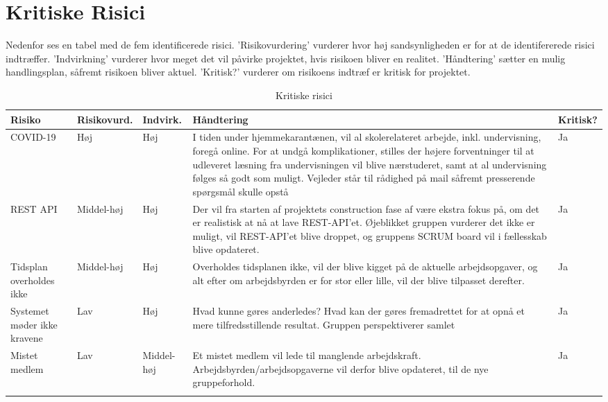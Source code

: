 \section{Kritiske Risici}

\noindent
Nedenfor ses en tabel med de fem identificerede risici. 'Risikovurdering' vurderer hvor høj sandsynligheden er for at de identifererede risici indtræffer. 'Indvirkning' vurderer hvor meget det vil påvirke projektet, hvis risikoen bliver en realitet. 'Håndtering' sætter en mulig handlingsplan, såfremt risikoen bliver aktuel. 'Kritisk?' vurderer om risikoens indtræf er kritisk for projektet.



\begin{longtable}[h]{|p{2cm}|p{2.2cm}|p{1.6cm}|p{7cm}|p{1.5cm}|}
    \hline
    \textbf{Risiko}                 &  \textbf{Risikovurd.}     &   \textbf{Indvirk.}    &   \textbf{Håndtering}         &   \textbf{Kritisk?}\\
    \hline
    COVID-19                    &   Høj                         &   Høj                     &   I tiden under hjemmekarantænen, vil al skolerelateret arbejde, inkl. undervisning, foregå online. For at undgå komplikationer, stilles der højere forventninger til at udleveret læsning fra undervisningen vil blive nærstuderet, samt at al undervisning følges så godt som muligt. Vejleder står til rådighed på mail såfremt presserende spørgsmål skulle opstå            &   Ja \\
    \hline
        REST API                    &   Middel-høj                  &   Høj                     &   Der vil fra starten af projektets construction fase af være ekstra fokus på, om det er realistisk at nå at lave REST-API'et. Øjeblikket gruppen vurderer det ikke er muligt, vil REST-API'et blive droppet, og gruppens SCRUM board vil i fællesskab blive opdateret.            &   Ja \\
    \hline
        Tidsplan overholdes ikke    &   Middel-høj                  &   Høj                     &   Overholdes tidsplanen ikke, vil der blive kigget på de aktuelle arbejdsopgaver, og alt efter om arbejdsbyrden er for stor eller lille, vil der blive tilpasset derefter.            &   Ja \\
    \hline 
        Systemet møder ikke kravene &   Lav                         &   Høj                     &   Hvad kunne gøres anderledes? Hvad kan der gøres fremadrettet for at opnå et mere tilfredsstillende resultat. Gruppen perspektiverer samlet             &   Ja \\
    \hline
        Mistet medlem               &   Lav                         &   Middel-høj              &   Et mistet medlem vil lede til manglende arbejdskraft. Arbejdsbyrden/arbejdsopgaverne vil derfor blive opdateret, til de nye gruppeforhold.            &   Ja \\
    \hline
    \caption{Kritiske risici}
    \label{tab:risks}
\end{longtable}